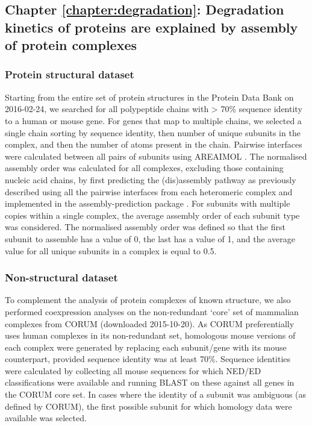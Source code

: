 \documentclass[a4paper,11pt,twoside,openright]{scrbook}
\begin{document}
\subsection{Chapter \ref*{chapter:degradation}: Degradation kinetics of proteins are explained by assembly of protein complexes}

\subsubsection{Protein structural dataset}
Starting from the entire set of protein structures in the Protein Data Bank on 2016-02-24, we searched for all polypeptide chains with > 70\% sequence identity to a human or mouse gene. For genes that map to multiple chains, we selected a single chain sorting by sequence identity, then number of unique subunits in the complex, and then the number of atoms present in the chain. Pairwise interfaces were calculated between all pairs of subunits using AREAIMOL \cite{Winn2011}. The normalised assembly order was calculated for all complexes, excluding those containing nucleic acid chains, by first predicting the (dis)assembly pathway as previously described using all the pairwise interfaces from each heteromeric complex \cite{Marsh2013} and implemented in the assembly-prediction package \cite{Wells2016}. For subunits with multiple copies within a single complex, the average assembly order of each subunit type was considered. The normalised assembly order was defined so that the first subunit to assemble has a value of 0, the last has a value of 1, and the average value for all unique subunits in a complex is equal to 0.5.

\subsubsection{Non-structural dataset}
To complement the analysis of protein complexes of known structure, we also performed coexpression analyses on the non-redundant `core' set of mammalian complexes from CORUM \cite{Ruepp2009} (downloaded 2015-10-20). As CORUM preferentially uses human complexes in its non-redundant set, homologous mouse versions of each complex were generated by replacing each subunit/gene with its mouse counterpart, provided sequence identity was at least 70\%. Sequence identities were calculated by collecting all mouse sequences for which NED/ED classifications were available and running BLAST on these against all genes in the CORUM core set. In cases where the identity of a subunit was ambiguous (as defined by CORUM), the first possible subunit for which homology data were available was selected.
\end{document}
